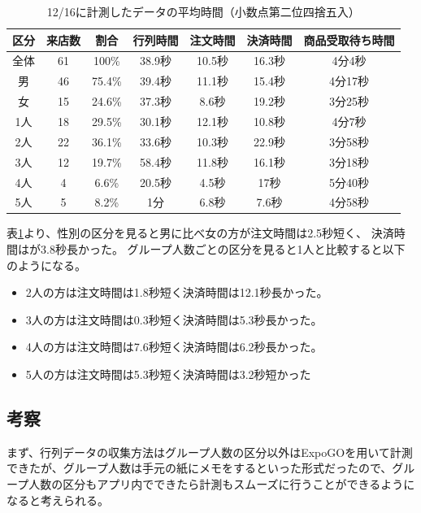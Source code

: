 \documentclass{jsarticle}
\begin{document}
\begin{table}[H]
 \begin{center}
  \caption{12/16に計測したデータの平均時間（小数点第二位四捨五入）}
    \begin{tabular}{|c|c|c|c|c|c|c|} \hline
区分 & 来店数 & 割合 & 行列時間 & 注文時間 & 決済時間 & 商品受取待ち時間 \\ \hline \hline
全体 & 61 & 100\%  & 38.9秒 & 10.5秒 & 16.3秒 & 4分4秒 \\ \hline \hline
男   & 46 & 75.4\% & 39.4秒 & 11.1秒 & 15.4秒 & 4分17秒 \\ \hline
女   & 15 & 24.6\% & 37.3秒 & 8.6秒  & 19.2秒 & 3分25秒  \\ \hline \hline
1人  & 18 & 29.5\% & 30.1秒 & 12.1秒 & 10.8秒 & 4分7秒  \\ \hline
2人  & 22 & 36.1\% & 33.6秒 & 10.3秒 & 22.9秒 & 3分58秒 \\ \hline
3人  & 12 & 19.7\% & 58.4秒 & 11.8秒 & 16.1秒 & 3分18秒 \\ \hline
4人  & 4  & 6.6\%  & 20.5秒 & 4.5秒  & 17秒   & 5分40秒 \\ \hline
5人  & 5  & 8.2\%  & 1分    & 6.8秒  & 7.6秒  & 4分58秒 \\ \hline
 \end{tabular}
 \label{table8}
 \end{center}
\end{table}

表\ref{table8}より、性別の区分を見ると男に比べ女の方が注文時間は2.5秒短く、
決済時間はが3.8秒長かった。
グループ人数ごとの区分を見ると1人と比較すると以下のようになる。
\begin{itemize}
\item 2人の方は注文時間は1.8秒短く決済時間は12.1秒長かった。
\item 3人の方は注文時間は0.3秒短く決済時間は5.3秒長かった。
\item 4人の方は注文時間は7.6秒短く決済時間は6.2秒長かった。
\item 5人の方は注文時間は5.3秒短く決済時間は3.2秒短かった
\end{itemize}





\subsection{考察}

まず、行列データの収集方法はグループ人数の区分以外はExpoGOを用いて計測できたが、グループ人数は手元の紙にメモをするといった形式だったので、グループ人数の区分もアプリ内でできたら計測もスムーズに行うことができるようになると考えられる。
\end{document}
